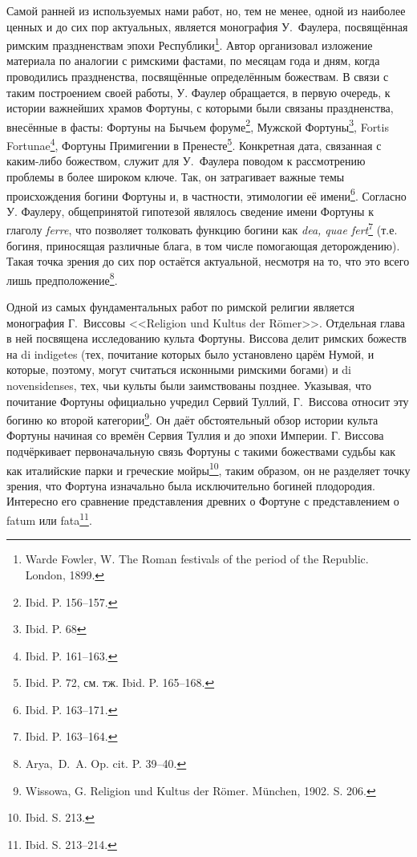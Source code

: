 
Самой ранней из используемых нами работ, но, тем не менее, одной из наиболее ценных и до сих пор актуальных, является монография У.~Фаулера, посвящённая римским праздненствам эпохи Республики\footnote{Warde Fowler, W. The Roman festivals of the period of the Republic. London, 1899.}. Автор организовал изложение материала по аналогии с римскими фастами, по месяцам года и дням, когда проводились праздненства, посвящённые определённым божествам. В связи с таким построением своей работы, У. Фаулер обращается, в первую очередь, к истории важнейших храмов Фортуны, с которыми были связаны праздненства, внесённые в фасты: Фортуны на Бычьем форуме\footnote{Ibid. P. 156--157.}, Мужской Фортуны\footnote{Ibid. P. 68}, Fortis Fortunae\footnote{Ibid. P. 161--163.}, Фортуны Примигении в Пренесте\footnote{Ibid. P. 72, см. тж. Ibid. P. 165--168.}. Конкретная дата, связанная с каким-либо божеством, служит для У.~Фаулера поводом к рассмотрению проблемы в более широком ключе. Так, он затрагивает важные темы происхождения богини Фортуны и, в частности, этимологии её имени\footnote{Ibid. P. 163--171.}. Согласно У. Фаулеру, общепринятой гипотезой являлось сведение имени Фортуны к глаголу \textit{ferre}, что позволяет толковать функцию богини как \textit{dea, quae fert}\footnote{Ibid. P. 163--164.} (т.е. богиня, приносящая различные блага, в том числе помогающая деторождению). Такая точка зрения до сих пор остаётся актуальной, несмотря на то, что это всего лишь предположение\footnote{Arya,~D.~A. Op. cit. P. 39--40.}.

Одной из самых фундаментальных работ по римской религии является монография Г.~Виссовы <<Religion und Kultus der R\"{o}mer>>. Отдельная глава в ней посвящена исследованию культа Фортуны. Виссова делит римских божеств на di indigetes (тех, почитание которых было установлено царём Нумой, и которые, поэтому, могут считаться исконными римскими богами) и di novensidenses, тех, чьи культы были заимствованы позднее. Указывая, что почитание Фортуны официально учредил Сервий Туллий, Г.~Виссова относит эту богиню ко второй категории\footnote{Wissowa, G. Religion und Kultus der R\"{o}mer. M\"{u}nchen, 1902. S. 206.}. Он даёт обстоятельный обзор истории культа Фортуны начиная со времён Сервия Туллия и до эпохи Империи. Г. Виссова подчёркивает первоначальную связь Фортуны с такими божествами судьбы как как италийские парки и греческие мойры\footnote{Ibid. S. 213.}, таким образом, он не разделяет точку зрения, что Фортуна изначально была исключительно богиней плодородия. Интересно его сравнение представления древних о Фортуне с представлением о fatum или fata\footnote{Ibid. S. 213--214.}.

